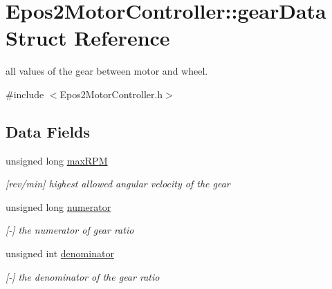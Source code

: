 \hypertarget{structEpos2MotorController_1_1gearData}{\section{Epos2\-Motor\-Controller\-:\-:gear\-Data Struct Reference}
\label{structEpos2MotorController_1_1gearData}
}


all values of the gear between motor and wheel.  




{\ttfamily \#include $<$Epos2\-Motor\-Controller.\-h$>$}

\subsection*{Data Fields}
\begin{DoxyCompactItemize}
\item 
\hypertarget{structEpos2MotorController_1_1gearData_aa6cb596cbe3360a0b2ba5a97b2009970}{unsigned long \hyperlink{structEpos2MotorController_1_1gearData_aa6cb596cbe3360a0b2ba5a97b2009970}{max\-R\-P\-M}}\label{structEpos2MotorController_1_1gearData_aa6cb596cbe3360a0b2ba5a97b2009970}

\begin{DoxyCompactList}\small\item\em \mbox{[}rev/min\mbox{]} highest allowed angular velocity of the gear \end{DoxyCompactList}\item 
\hypertarget{structEpos2MotorController_1_1gearData_a69545ff3667c5c0c813a674dc032babf}{unsigned long \hyperlink{structEpos2MotorController_1_1gearData_a69545ff3667c5c0c813a674dc032babf}{numerator}}\label{structEpos2MotorController_1_1gearData_a69545ff3667c5c0c813a674dc032babf}

\begin{DoxyCompactList}\small\item\em \mbox{[}-\/\mbox{]} the numerator of gear ratio \end{DoxyCompactList}\item 
\hypertarget{structEpos2MotorController_1_1gearData_a37ae5e17f19d2c2247efc6136234fc31}{unsigned int \hyperlink{structEpos2MotorController_1_1gearData_a37ae5e17f19d2c2247efc6136234fc31}{denominator}}\label{structEpos2MotorController_1_1gearData_a37ae5e17f19d2c2247efc6136234fc31}

\begin{DoxyCompactList}\small\item\em \mbox{[}-\/\mbox{]} the denominator of the gear ratio \end{DoxyCompactList}\end{DoxyCompactItemize}
